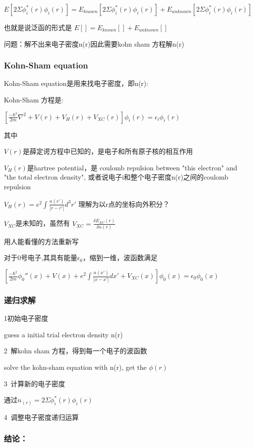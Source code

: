 \documentclass{article}
\begin{document}
$E[2\Sigma \phi_i^*(r)\phi_i(r)]=E_{known}[2\Sigma \phi_i^*(r)\phi_i(r)]+E_{unknown}[2\Sigma \phi_i^*(r)\phi_i(r)]$

也就是说泛函的形式是 
$E[]=E_{known}[]+E_{unknown}[]$

问题：解不出来电子密度n(r)因此需要kohn sham 方程解n(r)

\subsubsection {Kohn-Sham equation}

Kohn-Sham equation是用来找电子密度，即n(r):

Kohn-Sham 方程是:

$[\frac{-\hbar^2}{2m}\nabla^2+V(r)+V_H(r)+V_{XC}(r)]\phi_i(r)=\epsilon_i\phi_i(r)$

其中

$V(r)$是薛定谔方程中已知的，是电子和所有原子核的相互作用

$V_H(r)$是hartree potential，是 coulomb repulsion  between "this electron" and "the total electron density", 或者说电子i和整个电子密度n(r)之间的coulomb repulsion

$V_H(r)=e^2\int \frac{n(r')}{|r-r'|}d^3r'$
理解为以r点的坐标向外积分？

$V_{XC}$是未知的，虽然有
$V_{XC}=\frac{\delta E_{XC}(r)}{\delta n(r)} $

用人能看懂的方法重新写

对于0号电子,其具有能量$\epsilon_0$，缩到一维，波函数满足

$[\frac{-\hbar^2}{2m}\phi_0''(x)+V(x)+e^2\int \frac{n(x')}{|x-x'|}dx'+V_{XC}(x)]\phi_0(x)=\epsilon_0\phi_0(x)$

\subsubsection {递归求解}

1 初始电子密度

guess a initial trial electron density n(r)

2\ 解kohn sham 方程，得到每一个电子的波函数

solve the kohn-sham equation with n(r), get the $\phi(r)$

3\ 计算新的电子密度

通过$n_{(r)} = 2\Sigma \phi_i^*(r)\phi_i(r)$

4\ 调整电子密度递归运算

\subsubsection {结论：}
\end{document}
